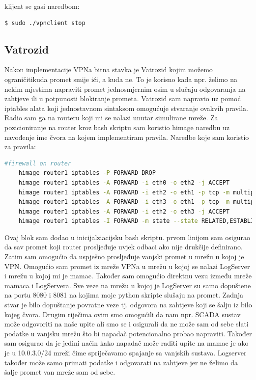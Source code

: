 \documentclass[times, utf8, zavrsni]{fer}
\begin{document}
klijent se gasi naredbom:
\begin{lstlisting}[language=bash, basicstyle=\footnotesize]
  $ sudo ./vpnclient stop
\end{lstlisting}

\subsection{Vatrozid}
Nakon implementacije VPNa bitna stavka je Vatrozid kojim možemo ograničitikuda promet smije ići, a kuda ne. To je korisno kada npr. želimo na nekim mjestima napraviti promet jednosmjernim osim u slučaju odgovaranja na zahtjeve ili u potpunosti blokiranje prometa. Vatrozid sam napravio uz pomoć iptables alata koji jednostavnom sintaksom omogućuje stvaranje ovakvih pravila. Radio sam ga na routeru koji mi se nalazi unutar simulirane mreže. Za pozicioniranje na router kroz bash skriptu sam koristio himage naredbu uz navođenje ime čvora na kojem implementiram pravila.
Naredbe koje sam koristio za pravila:
\begin{lstlisting}[language=bash, basicstyle=\footnotesize]
    #firewall on router
    himage router1 iptables -P FORWARD DROP
    himage router1 iptables -A FORWARD -i eth0 -o eth2 -j ACCEPT
    himage router1 iptables -A FORWARD -i eth2 -o eth1 -p tcp -m multiport --dports 8080,8081 -j ACCEPT
    himage router1 iptables -A FORWARD -i eth3 -o eth1 -p tcp -m multiport --dports 8080,8081 -j ACCEPT
    himage router1 iptables -A FORWARD -i eth2 -o eth3 -j ACCEPT
    himage router1 iptables -I FORWARD -m state --state RELATED,ESTABLISHED -j ACCEPT
\end{lstlisting}
Ovaj blok sam dodao u inicijalziacijsku bash skriptu.
prvom linijom sam osigurao da sav promet koji router prosljeđuje uvjek odbaci ako nije drukčije definirano.
Zatim sam omogućio da uspješno prosljeđuje vanjski promet u mrežu u kojoj je VPN.
Omogućio sam promet iz mreže VPNa u mrežu u kojoj se nalazi LogServer i mrežu u kojoj mi je mamac.  Također sam omogućio direktnu vezu između mreže mamaca i LogServera. Sve veze na mrežu u kojoj je LogServer su samo dopuštene na portu 8080 i 8081 na kojima moje python skripte slušaju na promet. Zadnja stvar je bilo dopuštanje povratne veze tj. odgovora na zahtjeve koji se šalju iz bilo kojeg čvora. Drugim riječima ovim smo omogućili da nam npr. SCADA sustav može odgovoriti na naše upite ali smo se i osigurali da ne može sam od sebe slati podatke u vanjsku mrežu što bi napadač potencionalno probao napraviti. Također sam osigurao da je jedini način kako napadač može raditi upite na mamac je ako je u 10.0.3.0/24 mreži čime spriječavamo spajanje sa vanjskih sustava. Logserver također može samo primati podatke i odgovarati na zahtjeve jer ne želimo da šalje promet van mreže sam od sebe. 
\end{document}
